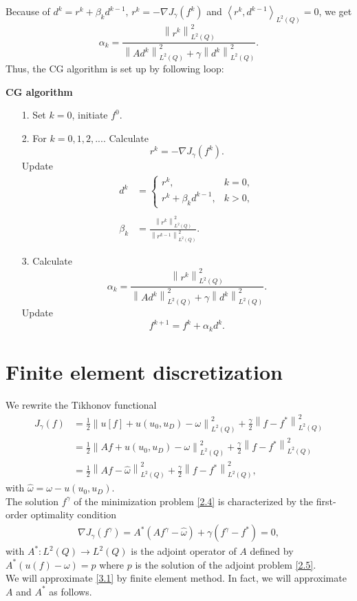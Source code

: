\documentclass[]{article}
\begin{document}
Because of $d^k=r^k+\beta_kd^{k-1},\, r^k=-\nabla J_\gamma (f^k)$ and $\left\langle r^k,d^{k-1}\right\rangle_{L^2(Q)}=0$, we get 
$$\alpha_k=\frac{\left\|r^k\right\|^2_{L^2(Q)}}{\displaystyle\left\|Ad^k\right\|^2_{L^2(Q)}+\gamma\left\|d^k\right\|^2_{L^2(Q)}}.$$
Thus, the CG algorithm is set up by following loop:

\noindent \textbf{CG algorithm}
\begin{itemize}
	\item[1.] Set $k=0$, initiate $f^0$.
	\item[2.] For $k=0, 1, 2,...$. Calculate
	$$r^k=-\nabla J_\gamma(f^k).$$
	Update\\
	\begin{align*}
		d^k&=\left\{\begin{array}{ll}
		r^k,& k=0,\\
		r^k+\beta_kd^{k-1},& k>0,
		\end{array}\right.\\\\
		\beta_k&=\frac{\left\|r^k\right\|^2_{L^2(Q)}}{\left\|r^{k-1}\right\|^2_{L^2(Q)}}.
	\end{align*}
	\item[3.] Calculate
	$$\alpha_k=\frac{\left\|r^k\right\|^2_{L^2(Q)}}{\displaystyle\left\|Ad^k\right\|^2_{L^2(Q)}+\gamma\left\|d^k\right\|^2_{L^2(Q)}}.$$
	Update
	$$f^{k+1}=f^{k}+\alpha_kd^k.$$
\end{itemize}

\section{Finite element discretization}\label{section4}
We rewrite the Tikhonov functional
\begin{align*}
	J_\gamma(f)&=\frac{1}{2}\left\| u[f]+ u(u_0, u_D)-\omega\right\|^2_{L^2(Q)}+\frac{\gamma}{2}\left\|f-f^*\right\|^2_{L^2(Q)}\\
	&=\frac{1}{2}\left\|Af+ u(u_0, u_D)-\omega\right\|^2_{L^2(Q)}+\frac{\gamma}{2}\left\|f-f^*\right\|^2_{L^2(Q)}\\
	&=\frac{1}{2}\left\|Af-\hat{\omega}\right\|^2_{L^2(Q)}+\frac{\gamma}{2}\left\|f-f^*\right\|^2_{L^2(Q)},
\end{align*}
with $\hat{\omega}=\omega- u(u_0, u_D)$.
\\
The solution $f^\gamma$ of the minimization problem \eqref{2.4} is characterized by the first-order optimality condition
\begin{align}\label{3.1}
	\nabla J_\gamma(f^\gamma)= A^*(Af^\gamma-\hat{\omega})+\gamma(f^\gamma-f^*)=0,
\end{align}
with $A^*: L^2(Q)\to L^2(Q)$ is the adjoint operator of $A$ defined by $A^*\left( u(f) - \omega\right) = p$ where $p$ is the solution of the adjoint problem \eqref{2.5}. 
\\
We will approximate \eqref{3.1} by finite element method. In fact, we will approximate $A$ and $A^*$ as follows.
\end{document}
